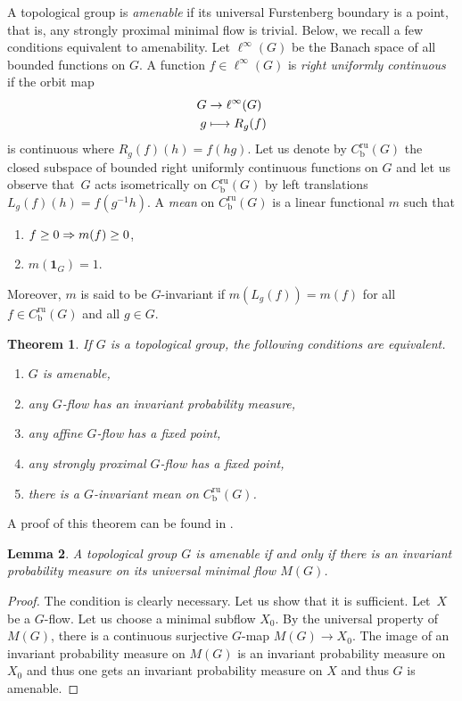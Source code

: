 \documentclass[JEP,XML,SOM,Unicode,NoFloatCountersInSection]{cedram}
\newcommand\mto{\mathchoice{\longmapsto}{\mapsto}{\mapsto}{\mapsto}}
\newcommand\implique{\mathchoice{\implies}{\Rightarrow}{\Rightarrow}{\Rightarrow}}
\newcommand{\rb}{\mathrm{b}}
\newcommand{\ru}{\mathrm{ru}}
\theoremstyle{plain}
\newtheorem{thm}{Theorem}[section]
\newtheorem{lem}[thm]{Lemma}
\theoremstyle{definition}
\begin{document}
A topological group is \emph{amenable} if its universal Furstenberg boundary is a point, that is, any strongly proximal minimal flow is trivial. Below, we recall a few conditions equivalent to amenability. Let $\ell^\infty(G)$ be the Banach space of all bounded functions on $G$. A function $f\in\ell^\infty(G)$ is \emph{right uniformly continuous} if the orbit map
\begin{align*}
G&\to\ell^\infty(G)\\
g&\mto R_g(f)
\end{align*}
is continuous where $R_g(f)(h)=f(hg)$. Let us denote by $C_\rb^{\ru}(G)$ the closed subspace of bounded right uniformly continuous functions on $G$ and let us observe that~$G$ acts isometrically on $C_\rb^{\ru}(G)$ by left translations $L_g(f)(h)=f(g^{-1}h)$. A \emph{mean} on $C_\rb^{\ru}(G)$ is a linear functional $m$ such that

\begin{enumerate}
\item $f\geq0\implique m(f)\geq0$,
\item $m(\mathbf{1}_G)=1$.
\end{enumerate}
Moreover, $m$ is said to be $G$-invariant if $m(L_g(f))=m(f)$ for all $f\in C_\rb^{\ru}(G)$ and all $g\in G$.

\begin{thm}\label{amenequiv}If $G$ is a topological group, the following conditions are equivalent.
\begin{enumerate}
\item $G$ is amenable,
\item any $G$-flow has an invariant probability measure,
\item any affine $G$-flow has a fixed point,
\item any strongly proximal $G$-flow has a fixed point,
\item there is a $G$-invariant mean on $C_\rb^{\ru}(G)$.
\end{enumerate}
\end{thm}

A proof of this theorem can be found in \cite[Th.\,III.3.1]{GlasnerLNM}.

\begin{lem}\label{amen} A topological group $G$ is amenable if and only if there is an invariant probability measure on its universal minimal flow $M(G)$.
\end{lem}

\begin{proof} The condition is clearly necessary. Let us show that it is sufficient. Let~$X$ be a $G$-flow. Let us choose a minimal subflow $X_0$. By the universal property of $M(G)$, there is a continuous surjective $G$-map $M(G)\to X_0$. The image of an invariant probability measure on $M(G)$ is an invariant probability measure on $X_0$ and thus one gets an invariant probability measure on $X$ and thus $G$ is amenable.
\end{proof}
\end{document}
